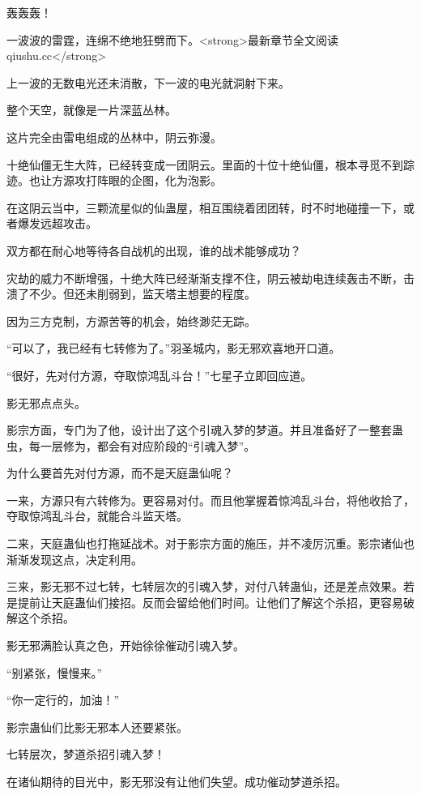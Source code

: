 
\begin{this_body}

轰轰轰！

一波波的雷霆，连绵不绝地狂劈而下。<strong>最新章节全文阅读qiushu.cc</strong>

上一波的无数电光还未消散，下一波的电光就洞射下来。

整个天空，就像是一片深蓝丛林。

这片完全由雷电组成的丛林中，阴云弥漫。

十绝仙僵无生大阵，已经转变成一团阴云。里面的十位十绝仙僵，根本寻觅不到踪迹。也让方源攻打阵眼的企图，化为泡影。

在这阴云当中，三颗流星似的仙蛊屋，相互围绕着团团转，时不时地碰撞一下，或者爆发远超攻击。

双方都在耐心地等待各自战机的出现，谁的战术能够成功？

灾劫的威力不断增强，十绝大阵已经渐渐支撑不住，阴云被劫电连续轰击不断，击溃了不少。但还未削弱到，监天塔主想要的程度。

因为三方克制，方源苦等的机会，始终渺茫无踪。

“可以了，我已经有七转修为了。”羽圣城内，影无邪欢喜地开口道。

“很好，先对付方源，夺取惊鸿乱斗台！”七星子立即回应道。

影无邪点点头。

影宗方面，专门为了他，设计出了这个引魂入梦的梦道。并且准备好了一整套蛊虫，每一层修为，都会有对应阶段的“引魂入梦”。

为什么要首先对付方源，而不是天庭蛊仙呢？

一来，方源只有六转修为。更容易对付。而且他掌握着惊鸿乱斗台，将他收拾了，夺取惊鸿乱斗台，就能合斗监天塔。

二来，天庭蛊仙也打拖延战术。对于影宗方面的施压，并不凌厉沉重。影宗诸仙也渐渐发现这点，决定利用。

三来，影无邪不过七转，七转层次的引魂入梦，对付八转蛊仙，还是差点效果。若是提前让天庭蛊仙们接招。反而会留给他们时间。让他们了解这个杀招，更容易破解这个杀招。

影无邪满脸认真之色，开始徐徐催动引魂入梦。

“别紧张，慢慢来。”

“你一定行的，加油！”

影宗蛊仙们比影无邪本人还要紧张。

七转层次，梦道杀招引魂入梦！

在诸仙期待的目光中，影无邪没有让他们失望。成功催动梦道杀招。


\end{this_body}

